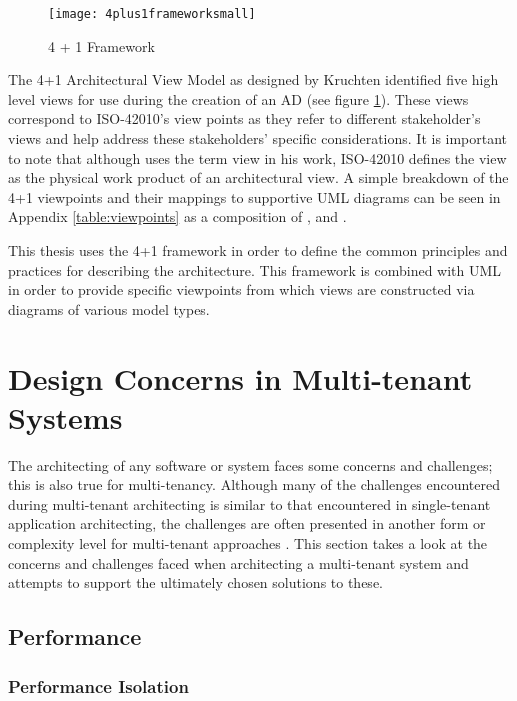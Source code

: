 \begin{figure}
\centering
\texttt{[image: 4plus1frameworksmall]}
\caption{4 + 1 Framework}
\label{fig:4plus1frameworksmall}
\end{figure}

The 4+1 Architectural View Model as designed by Kruchten \cite{Kruchten} identified five high level views for use during the creation of an AD (see figure \ref{fig:4plus1frameworksmall}). These views correspond to ISO-42010's view points as they refer to different stakeholder's views and help address these stakeholders' specific considerations. It is important to note that although \cite{Kruchten} uses the term view in his work, ISO-42010 defines the view as the physical work product of an architectural view. A simple breakdown of the 4+1 viewpoints and their mappings to supportive UML diagrams can be seen in Appendix \ref{table:viewpoints} as a composition of \cite{Wiki4plus1}, \cite{Muchandi2007} and \cite{Kruchten}.


This thesis uses the 4+1 framework in order to define the common principles and practices for describing the architecture. This framework is combined with UML in order to provide specific viewpoints from which views are constructed via diagrams of various model types.



\section{Design Concerns in Multi-tenant Systems}
The architecting of any software or system faces some concerns and challenges; this is also true for multi-tenancy. Although many of the challenges encountered during multi-tenant architecting is similar to that encountered in single-tenant application architecting, the challenges are often presented in another form or complexity level for multi-tenant approaches \cite{Bezemer:2010:MSA:1862372.1862393}. This section takes a look at the concerns and challenges faced when architecting a multi-tenant system and attempts to support the ultimately chosen solutions to these.

\subsection{Performance}
\label{sec:performance}
\subsubsection{\textbf{Performance Isolation}}

